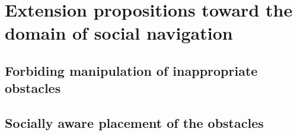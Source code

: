 
\chapter{Extension propositions toward the domain of social navigation} %

\label{Chapter4} %

\section{Forbiding manipulation of inappropriate obstacles}

\section{Socially aware placement of the obstacles}
